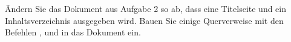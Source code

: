 Ändern Sie das Dokument aus Aufgabe 2 so ab, dass eine Titelseite und ein Inhaltsverzeichnis ausgegeben wird. Bauen Sie einige Querverweise mit den Befehlen ,  und  in das Dokument ein.